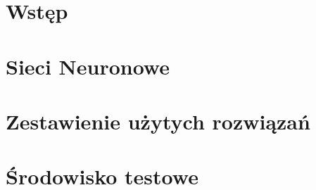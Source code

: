 \chapter{Wstęp}



\chapter{Sieci Neuronowe}



\chapter{Zestawienie użytych rozwiązań}

\chapter{Środowisko testowe}




%



%
%

%

%
